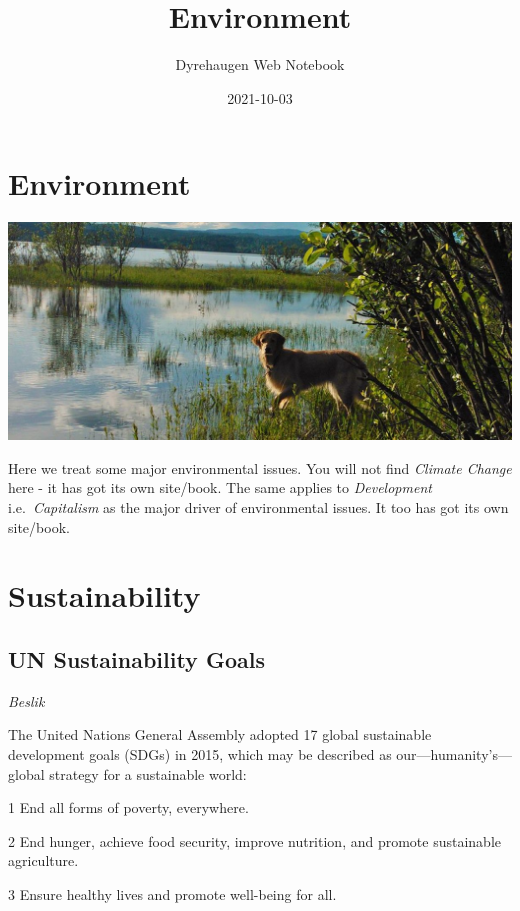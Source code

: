 \documentclass[
]{book}
\title{Environment}
\author{Dyrehaugen Web Notebook}
\date{2021-10-03}
\begin{document}
\maketitle

{
\setcounter{tocdepth}{1}
\tableofcontents
}
\hypertarget{environment}{%
\chapter{Environment}\label{environment}}

\includegraphics{fig/zelda.jpg}

Here we treat some major environmental issues.
You will not find \emph{Climate Change} here - it has got its own site/book.
The same applies to \emph{Development} i.e.~\emph{Capitalism} as the major
driver of environmental issues.
It too has got its own site/book.

\hypertarget{sustainability}{%
\chapter{Sustainability}\label{sustainability}}

\hypertarget{un-sustainability-goals}{%
\section{UN Sustainability Goals}\label{un-sustainability-goals}}

\emph{Beslik}

The United Nations General Assembly adopted 17 global sustainable development goals (SDGs) in 2015, which may be described as our---humanity's---global strategy for a sustainable world:

1 End all forms of poverty, everywhere.

2 End hunger, achieve food security, improve nutrition, and promote sustainable agriculture.

3 Ensure healthy lives and promote well-being for all.
\end{document}
